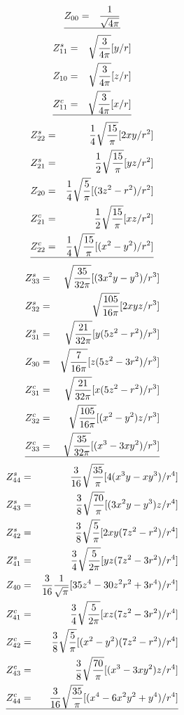 \begin{eqnarray*}
Z_{00}&=&\frac{1}{\sqrt{4\pi}}\\
\hline
\end{eqnarray*}
\begin{eqnarray*}
Z^s_{11}&=&\sqrt{\frac{3}{4\pi}}[y/r] \\
Z_{10}&=&\sqrt{\frac{3}{4\pi}}[z/r] \\
Z^c_{11}&=&\sqrt{\frac{3}{4\pi}}[x/r] \\
\hline
\end{eqnarray*}
\begin{eqnarray*}
Z^s_{22}&=&\frac{1}{4}\sqrt{\frac{15}{\pi}}[2xy/r^2] \\
Z^s_{21}&=&\frac{1}{2}\sqrt{\frac{15}{\pi}}[yz/r^2] \\
Z_{20}&=&\frac{1}{4}\sqrt{\frac{5}{\pi}}[(3z^2-r^2)/r^2] \\
Z^c_{21}&=&\frac{1}{2}\sqrt{\frac{15}{\pi}}[xz/r^2] \\
Z^c_{22}&=&\frac{1}{4}\sqrt{\frac{15}{\pi}}[(x^2-y^2)/r^2] \\
\hline
\end{eqnarray*}
\begin{eqnarray*}
Z^s_{33}&=&\sqrt{\frac{35}{32\pi}}[(3x^2y-y^3)/r^3] \\
Z^s_{32}&=&\sqrt{\frac{105}{16\pi}}[2xyz/r^3] \\
Z^s_{31}&=&\sqrt{\frac{21}{32\pi}}[y(5z^2-r^2)/r^3] \\
Z_{30}&=&\sqrt{\frac{7}{16\pi}}[z(5z^2-3r^2)/r^3] \\
Z^c_{31}&=&\sqrt{\frac{21}{32\pi}}[x(5z^2-r^2)/r^3] \\
Z^c_{32}&=&\sqrt{\frac{105}{16\pi}}[(x^2-y^2)z/r^3] \\
Z^c_{33}&=&\sqrt{\frac{35}{32\pi}}[(x^3-3xy^2)/r^3] \\
\hline
\end{eqnarray*}
\begin{eqnarray*}
Z^s_{44}&=&\frac{3}{16}\sqrt{\frac{35}{\pi}}[4(x^3y-xy^3)/r^4] \\
Z^s_{43}&=&\frac{3}{8}\sqrt{\frac{70}{\pi}}[(3x^2y-y^3)z/r^4] \\
Z^s_{42}&=&\frac{3}{8}\sqrt{\frac{5}{\pi}}[2xy(7z^2-r^2)/r^4] \\
Z^s_{41}&=&\frac{3}{4}\sqrt{\frac{5}{2\pi}}[yz(7z^2-3r^2)/r^4] \\
Z_{40}&=&\frac{3}{16}\frac{1}{\sqrt{\pi}}[35z^4-30z^2r^2+3r^4)/r^4] \\
Z^c_{41}&=&\frac{3}{4}\sqrt{\frac{5}{2\pi}}[xz(7z^2-3r^2)/r^4] \\
Z^c_{42}&=&\frac{3}{8}\sqrt{\frac{5}{\pi}}[(x^2-y^2)(7z^2-r^2)/r^4] \\
Z^c_{43}&=&\frac{3}{8}\sqrt{\frac{70}{\pi}}[(x^3-3xy^2)z/r^4] \\
Z^c_{44}&=&\frac{3}{16}\sqrt{\frac{35}{\pi}}[(x^4-6x^2y^2+y^4)/r^4] \\
\hline
\end{eqnarray*}
